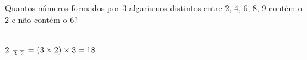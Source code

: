 \begin{ex}
 Quantos números formados por 3 algarismos distintos entre 2, 4, 6, 8, 9 contém o 2 e não contém o 6?
  \begin{sol}
      \phantom{A} \\
  $2\hspace{1mm}\frac{\phantom{A}}{3}\frac{\phantom{A}}{2}= (3\times2)\times3=18$
  \end{sol}
\end{ex}